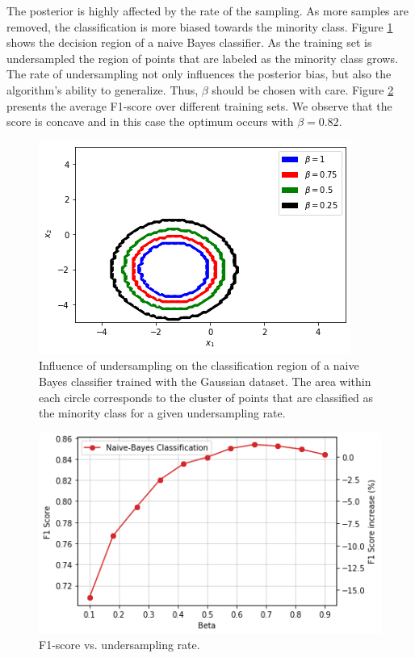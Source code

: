 \documentclass[conference]{IEEEtran}
\begin{document}
		The posterior is highly affected by the rate of the sampling. As more samples are removed, the classification is more biased towards the minority class. Figure \ref{fig.:Undersampling_2D_Contour_Classification} shows the decision region of a naive Bayes classifier. As the training set is undersampled the region of points that are labeled as the minority class grows. The rate of undersampling not only influences the posterior bias, but also the algorithm's ability to generalize. Thus, $\beta$ should be chosen with care. Figure \ref{fig.:Undersampling_F1_Score} presents the average F1-score over different training sets. We observe that the score is concave and in this case the optimum occurs with $\beta=0.82$.

			\begin{figure}
				\includegraphics[scale=0.3]{Undersampling_2D_Contour_Classification}
				\centering
				\caption{Influence of undersampling on the classification region of a naive Bayes classifier trained with the Gaussian dataset. The area within each circle corresponds to the cluster of points that are classified as the minority class for a given undersampling rate.}
				\label{fig.:Undersampling_2D_Contour_Classification}
			\end{figure}
			\begin{figure}
				\includegraphics[scale=0.3]{Undersampling_F1_Score}
				\centering
				\caption{F1-score vs. undersampling rate.}
				\label{fig.:Undersampling_F1_Score}
			\end{figure}
\end{document}
